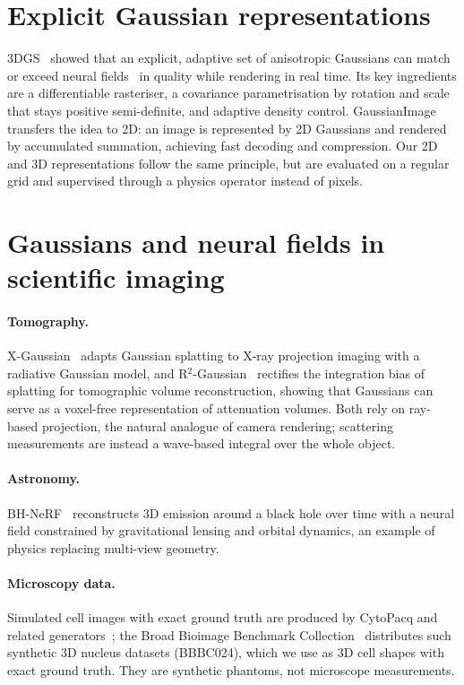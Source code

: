\section{Explicit Gaussian representations}
3DGS~\citep{kerbl20233dgs} showed that an explicit, adaptive set of anisotropic Gaussians can match or exceed neural
fields~\citep{mildenhall2020nerf,mueller2022instantngp} in quality while rendering in real time. Its key ingredients
are a differentiable rasteriser, a covariance parametrisation by rotation and scale that stays positive
semi-definite, and adaptive density control. GaussianImage~\citep{zhang2024gaussianimage} transfers the idea to 2D:
an image is represented by 2D Gaussians and rendered by accumulated summation, achieving fast decoding and
compression. Our 2D and 3D representations follow the same principle, but are evaluated on a regular grid and
supervised through a physics operator instead of pixels.

\section{Gaussians and neural fields in scientific imaging}
\paragraph{Tomography.} X-Gaussian~\citep{cai2024xgaussian} adapts Gaussian splatting to X-ray projection imaging
with a radiative Gaussian model, and R$^2$-Gaussian~\citep{zha2024r2gaussian} rectifies the integration bias of
splatting for tomographic volume reconstruction, showing that Gaussians can serve as a voxel-free representation of
attenuation volumes. Both rely on ray-based projection, the natural analogue of camera rendering; scattering
measurements are instead a wave-based integral over the whole object.
\paragraph{Astronomy.} BH-NeRF~\citep{levis2022bhnerf} reconstructs 3D emission around a black hole over time with a
neural field constrained by gravitational lensing and orbital dynamics, an example of physics replacing multi-view
geometry.
\paragraph{Microscopy data.} Simulated cell images with exact ground truth are produced by CytoPacq and related
generators~\citep{wiesner2019cytopacq}; the Broad Bioimage Benchmark Collection~\citep{ljosa2012bbbc} distributes such
synthetic 3D nucleus datasets (BBBC024), which we use as 3D cell shapes with exact ground truth. They are synthetic
phantoms, not microscope measurements.

